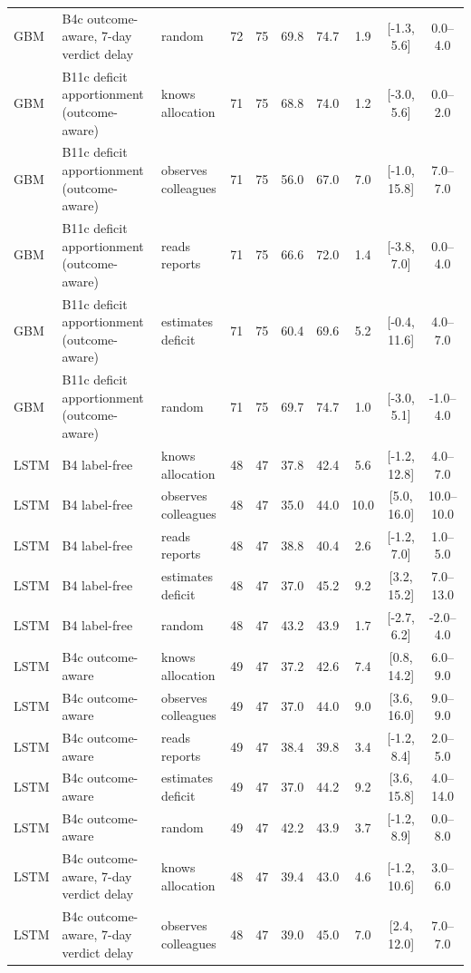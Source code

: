 \begin{table}[!t]
\begin{tabular}{lllccccccc}
GBM & B4c outcome-aware, 7-day verdict delay & random & 72 & 75 & 69.8 & 74.7 & 1.9 & [-1.3, 5.6] & 0.0--4.0 \\
GBM & B11c deficit apportionment (outcome-aware) & knows allocation & 71 & 75 & 68.8 & 74.0 & 1.2 & [-3.0, 5.6] & 0.0--2.0 \\
GBM & B11c deficit apportionment (outcome-aware) & observes colleagues & 71 & 75 & 56.0 & 67.0 & 7.0 & [-1.0, 15.8] & 7.0--7.0 \\
GBM & B11c deficit apportionment (outcome-aware) & reads reports & 71 & 75 & 66.6 & 72.0 & 1.4 & [-3.8, 7.0] & 0.0--4.0 \\
GBM & B11c deficit apportionment (outcome-aware) & estimates deficit & 71 & 75 & 60.4 & 69.6 & 5.2 & [-0.4, 11.6] & 4.0--7.0 \\
GBM & B11c deficit apportionment (outcome-aware) & random & 71 & 75 & 69.7 & 74.7 & 1.0 & [-3.0, 5.1] & -1.0--4.0 \\
LSTM & B4 label-free & knows allocation & 48 & 47 & 37.8 & 42.4 & 5.6 & [-1.2, 12.8] & 4.0--7.0 \\
LSTM & B4 label-free & observes colleagues & 48 & 47 & 35.0 & 44.0 & 10.0 & [5.0, 16.0] & 10.0--10.0 \\
LSTM & B4 label-free & reads reports & 48 & 47 & 38.8 & 40.4 & 2.6 & [-1.2, 7.0] & 1.0--5.0 \\
LSTM & B4 label-free & estimates deficit & 48 & 47 & 37.0 & 45.2 & 9.2 & [3.2, 15.2] & 7.0--13.0 \\
LSTM & B4 label-free & random & 48 & 47 & 43.2 & 43.9 & 1.7 & [-2.7, 6.2] & -2.0--4.0 \\
LSTM & B4c outcome-aware & knows allocation & 49 & 47 & 37.2 & 42.6 & 7.4 & [0.8, 14.2] & 6.0--9.0 \\
LSTM & B4c outcome-aware & observes colleagues & 49 & 47 & 37.0 & 44.0 & 9.0 & [3.6, 16.0] & 9.0--9.0 \\
LSTM & B4c outcome-aware & reads reports & 49 & 47 & 38.4 & 39.8 & 3.4 & [-1.2, 8.4] & 2.0--5.0 \\
LSTM & B4c outcome-aware & estimates deficit & 49 & 47 & 37.0 & 44.2 & 9.2 & [3.6, 15.8] & 4.0--14.0 \\
LSTM & B4c outcome-aware & random & 49 & 47 & 42.2 & 43.9 & 3.7 & [-1.2, 8.9] & 0.0--8.0 \\
LSTM & B4c outcome-aware, 7-day verdict delay & knows allocation & 48 & 47 & 39.4 & 43.0 & 4.6 & [-1.2, 10.6] & 3.0--6.0 \\
LSTM & B4c outcome-aware, 7-day verdict delay & observes colleagues & 48 & 47 & 39.0 & 45.0 & 7.0 & [2.4, 12.0] & 7.0--7.0 \\

\end{tabular}
\end{table}
